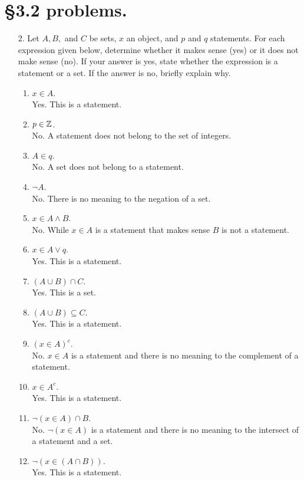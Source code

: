 \documentclass[a4paper, 12pt]{../../config/homework}
\begin{document}
\section*{\S 3.2 problems.}
\begin{enumerate}
\item[2.] Let $A,B,$ and $C$ be sets, $x$ an object, and $p$ and $q$ statements. For each expression given below, determine whether it makes sense (yes) or it does not make sense (no). If your answer is yes, state whether the expression is a statement or a set. If the answer is no, briefly explain why.
\begin{enumerate}[label=\alph*)]
\item $x\in A$.
\\Yes. This is a statement.
\item $p\in\mathbb{Z}$.
\\No. A statement does not belong to the set of integers.
\item $A\in q$.
\\No. A set does not belong to a statement.
\item $\neg A$.
\\No. There is no meaning to the negation of a set.
\item $x\in A \land B$.
\\No. While $x\in A$ is a statement that makes sense $B$ is not a statement.
\item $x\in A \lor q$.
\\Yes. This is a statement.
\item $(A \cup B) \cap C$.
\\Yes. This is a set.
\item $(A\cup B) \subseteq C$.
\\Yes. This is a statement.
\item $(x\in A)^c$.
\\No. $x\in A$ is a statement and there is no meaning to the complement of a statement.
\item $x\in A^c$.
\\Yes. This is a statement.
\item $\neg (x\in A) \cap B$.
\\No. $\neg (x\in A)$ is a statement and there is no meaning to the intersect of a statement and a set.
\item $\neg (x \in (A \cap B))$.
\\Yes. This is a statement.
\end{enumerate}


\end{enumerate}
\end{document}
